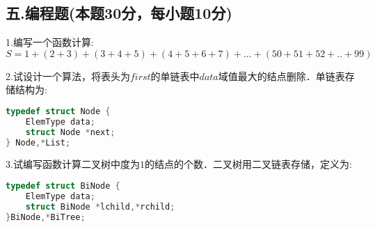 \subsection{五.编程题(本题30分，每小题10分)}
1.编写一个函数计算: \\
$S=1+(2+3)+(3+4+5)+(4+5+6+7)+...+(50+51+52+..+99)$

2.试设计一个算法，将表头为$first$的单链表中$data$域值最大的结点删除．单链表存储结构为:
\begin{lstlisting}[language=cpp]
typedef struct Node {
    ElemType data;
    struct Node *next;
} Node,*List;
\end{lstlisting}

3.试编写函数计算二叉树中度为$1$的结点的个数．二叉树用二叉链表存储，定义为:
\begin{lstlisting}[language=cpp]
typedef struct BiNode {
    ElemType data;
    struct BiNode *lchild,*rchild;
}BiNode,*BiTree;
\end{lstlisting}